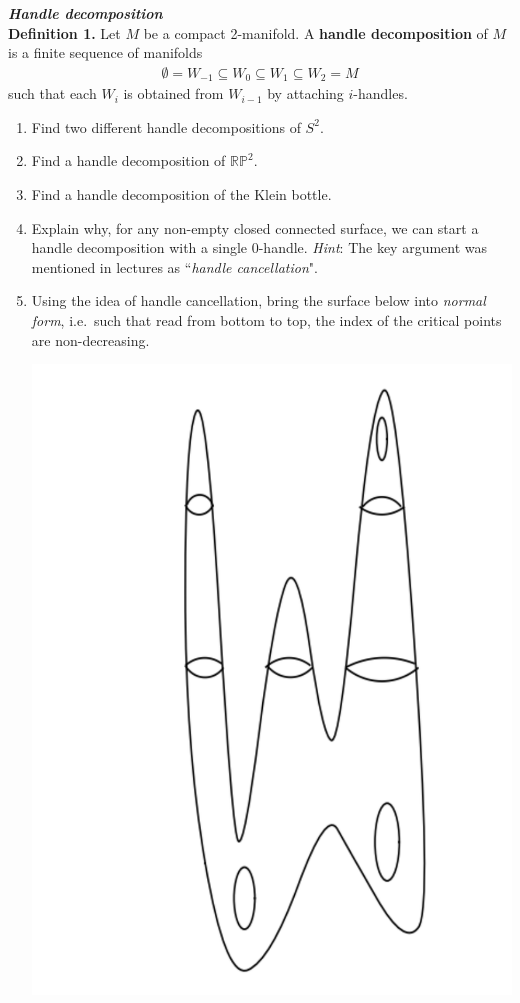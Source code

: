 \begin{exercise} \textbf{\textit{Handle decomposition}}\\
\textbf{Definition 1.} Let \(M\) be a compact 2-manifold. A \textbf{handle decomposition} of \(M\) is a finite sequence of manifolds 
\begin{align*}
\emptyset = W_{-1} \subseteq W_0 \subseteq W_1 \subseteq W_2 = M
\end{align*}
 such that each \(W_i\) is obtained from \(W_{i-1}\) by attaching \(i\)-handles. 
\begin{enumerate}[label=(\alph*)] 
            \item Find two different handle decompositions of \(S^2\). 	
		\item Find a handle decomposition of \(\mathbb{R}\mathbb{P}^2\). 
		\item Find a handle decomposition of the Klein bottle. 
		\item  Explain why, for any non-empty closed connected surface, we can start a handle decomposition with a single 0-handle. \textit{Hint}: The key argument was mentioned in lectures as ``\emph{handle cancellation}".
		\item Using the idea of handle cancellation, bring the surface below into {\em normal form}, i.e.~such that read from bottom to top, the index of the critical points are non-decreasing.
		\begin{center}
			\includegraphics[scale=0.3]{images/Exercises/FunkyTorus.png}
		\end{center}
\end{enumerate}

\end{exercise}

